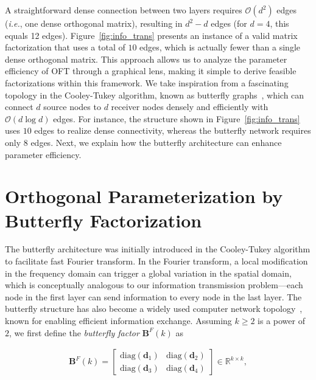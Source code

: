 A straightforward dense connection between two layers requires $\mathcal{O}(d^2)$ edges (\emph{i.e.}, one dense orthogonal matrix), resulting in $d^2-d$ edges (for $d=4$, this equals 12 edges). Figure~\ref{fig:info_trans} presents an instance of a valid matrix factorization that uses a total of $10$ edges, which is actually fewer than a single dense orthogonal matrix. This approach allows us to analyze the parameter efficiency of OFT through a graphical lens, making it simple to derive feasible factorizations within this framework. We take inspiration from a fascinating topology in the Cooley-Tukey algorithm, known as butterfly graphs~\cite{cooley1965algorithm}, which can connect $d$ source nodes to $d$ receiver nodes densely and efficiently with $\mathcal{O}(d\log d)$ edges. For instance, the structure shown in Figure~\ref{fig:info_trans} uses $10$ edges to realize dense connectivity, whereas the butterfly network requires only $8$ edges. Next, we explain how the butterfly architecture can enhance parameter efficiency.

\section{Orthogonal Parameterization by Butterfly Factorization}

The butterfly architecture was initially introduced in the Cooley-Tukey algorithm to facilitate fast Fourier transform. In the Fourier transform, a local modification in the frequency domain can trigger a global variation in the spatial domain, which is conceptually analogous to our information transmission problem—each node in the first layer can send information to every node in the last layer. The butterfly structure has also become a widely used computer network topology~\cite{solihin2015fundamentals,li2011linear}, known for enabling efficient information exchange. Assuming $k \geq 2$ is a power of $2$, we first define the \emph{butterfly factor} $\bm{B}^F(k)$ as

\begin{equation}\label{eq:but_factor}
\begin{aligned}
    \bm{B}^F(k)=\begin{bmatrix}
    \text{diag}(\bm{d}_1) & \text{diag}(\bm{d}_2) \\
    \text{diag}(\bm{d}_3) & \text{diag}(\bm{d}_4)
    \end{bmatrix}\in\mathbb{R}^{k\times k},
\end{aligned}
\end{equation}

